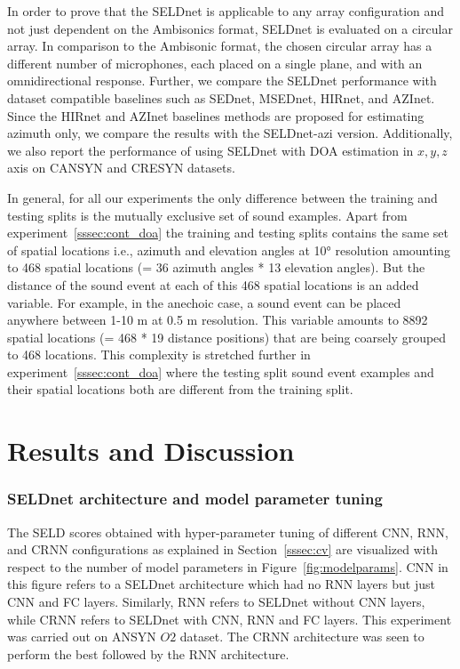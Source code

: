 \documentclass[journal]{IEEEtran}
\begin{document}
In order to prove that the SELDnet is applicable to any array configuration and not just dependent on the Ambisonics format, SELDnet is evaluated on a circular array. In comparison to the Ambisonic format, the chosen circular array has a different number of microphones,  each placed on a single plane, and with an omnidirectional response. Further, we compare the SELDnet performance with dataset compatible baselines such as SEDnet, MSEDnet, HIRnet, and AZInet. Since the HIRnet and AZInet baselines methods are proposed for estimating azimuth only, we compare the results with the SELDnet-azi version. Additionally, we also report the performance of using SELDnet with DOA estimation in $x, y, z$ axis on CANSYN and CRESYN datasets.


In general, for all our experiments the only difference between the training and testing splits is the mutually exclusive set of sound examples. Apart from experiment~\ref{sssec:cont_doa} the training and testing splits contains the same set of spatial locations i.e., azimuth and elevation angles at \ang{10} resolution amounting to 468 spatial locations (= 36 azimuth angles * 13 elevation angles). But the distance of the sound event at each of this 468 spatial locations is an added variable. For example, in the anechoic case, a sound event can be placed anywhere between 1-10 m at 0.5 m resolution. This variable amounts to 8892 spatial locations (= 468 * 19 distance positions) that are being coarsely grouped to 468 locations. This complexity is stretched further in experiment~\ref{sssec:cont_doa} where the testing split sound event examples and their spatial locations both are different from the training split.


\section{Results and Discussion}
\label{sec:results}
\subsubsection{SELDnet architecture and model parameter tuning}
\label{sssec:arch}

The SELD scores obtained with hyper-parameter tuning of different CNN, RNN, and CRNN configurations as explained in Section~\ref{sssec:cv} are visualized with respect to the number of model parameters in Figure~\ref{fig:modelparams}. CNN in this figure refers to a SELDnet architecture which had no RNN layers but just CNN and FC layers. Similarly, RNN refers to SELDnet without CNN layers, while CRNN refers to SELDnet with CNN, RNN and FC layers. This experiment was carried out on ANSYN $O2$ dataset. The CRNN architecture was seen to perform the best followed by the RNN architecture. 
\end{document}
